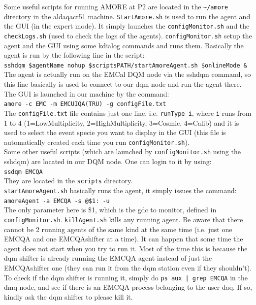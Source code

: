 Some useful scripts for running AMORE at P2 are located in the \texttt{\textasciitilde/amore} directory in the aldaqacr51 machine. \texttt{StartAmore.sh} is used to run the agent and the GUI (in the expert mode). It simply launches the \texttt{configMonitor.sh} and the \texttt{checkLogs.sh} (used to check the logs of the agents). \texttt{configMonitor.sh} setup the agent and the GUI using some kdialog commands and runs them.
Basically the agent is run by the following line in the script:\\
\texttt{sshdqm \$agentName nohup \$scriptsPATH/startAmoreAgent.sh \$onlineMode \&}\\
The agent is actually run on the EMCal DQM node via the sshdqm command, so this line basically is used to connect to our dqm node and run the agent there.\\
The GUI is launched in our machine by the command:\\
\texttt{amore -c EMC -m EMCUIQA(TRU) -g configFile.txt}\\
The \texttt{configFile.txt} file contains just one line, i.e. \texttt{runType i}, where \texttt {i} runs from 1 to 4 (1=LowMultiplicity, 2=HighMultiplicity, 3=Cosmic, 4=Calib) and it is used to select the event specie you want to display in the GUI (this file is automatically created each time you run \texttt{configMonitor.sh}).\\
Some other useful scripts (which are launched by \texttt{configMonitor.sh} using the sshdqm) are located in our DQM node. One can login to it by using:\\
\texttt{ssdqm EMCQA}\\
They are located in the \texttt{scripts} directory.\\
\texttt{startAmoreAgent.sh} basically runs the agent, it simply issues the command:\\
\texttt{amoreAgent -a EMCQA -s @\$1: -u}\\
The only parameter here is \$1, which is the gdc to monitor, defined in \texttt{configMonitor.sh}. 
\texttt{killAgent.sh} kills any running agent. Be aware that there cannot be 2 running agents  of the same kind at the same time (i.e. just one EMCQA and one EMCQAshifter at a time). It can happen that some time the agent does not start when you try to run it. Most of the time this is because the dqm shifter is already running the EMCQA agent instead of just the EMCQAshifter one (they can run it from the dqm station even if they shouldn't). To check if the dqm shifter is running it, simply do \texttt{ps aux | grep EMCQA} in the dmq node, and see if there is an EMCQA process belonging to the user daq. If so, kindly ask the dqm shifter to please kill it.\\
